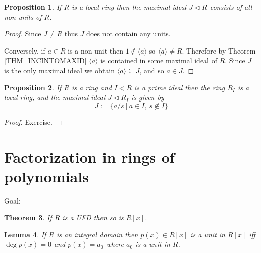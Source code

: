 \documentclass[12pt, letterpaper, oneside]{article}
\theoremstyle{plain}
\newtheorem{theorem}{Theorem}[section]
\newtheorem{lemma}[theorem]{Lemma}
\newtheorem{proposition}[theorem]{Proposition}
\theoremstyle{definition}
\newcommand{\subgp}[1]{\langle#1\rangle}
\newcommand{\vs}{\vskip 5mm}
\begin{document}
 \vs\vs
 
 \begin{proposition}
 If $R$ is a local ring then the maximal ideal $J\lhd R$ consists of all non-units of $R$. 
  \end{proposition}
 
 \vs
 
 \begin{proof} 
 Since $J\neq R$ thus $J$ does not contain any units. 
 
 Conversely, if $a\in R$ is a non-unit then $1\not\in \subgp{a}$ so $\subgp{a}\neq R$.    
 Therefore by  Theorem \ref{THM_INCINTOMAXID} $\subgp{a}$ is contained in 
 some maximal ideal of $R$. Since $J$ is the only maximal ideal we obtain 
 $\subgp{a}\subseteq J$, and so $a\in J$.
  \end{proof}
 
 \vs\vs
 
 
 \begin{proposition}
 If $R$ is a ring and $I\lhd R$ is a prime ideal then the ring $R_{I}$ is a local ring, and the 
 maximal ideal $J\lhd R_{I}$ is given by 
 $$J:= \{ a/s \ | \ a\in I, \ s\not\in I \}$$
 \end{proposition}
 
 
 \vs 
 
 \begin{proof}
 Exercise. 
 \end{proof}
 
 
 
 




\newpage
\section{Factorization in rings of polynomials}
\label{SEC_FACTINPOLYRINGS}
 
 
 Goal:
 
\begin{theorem}
\label{THM_POLYUFD}
If $R$ is a UFD then so is $R[x]$.
\end{theorem} 
 

\vs\vs 




\begin{lemma}
\label{LEMMA_UNITPOLY}
If $R$ is an integral domain then $p(x)\in R[x]$ is a unit in $R[x]$ iff
$\deg p(x) = 0$ and  $p(x) = a_{0}$ where $a_{0}$ is a unit in $R$.
\end{lemma} 
 
\end{document}
